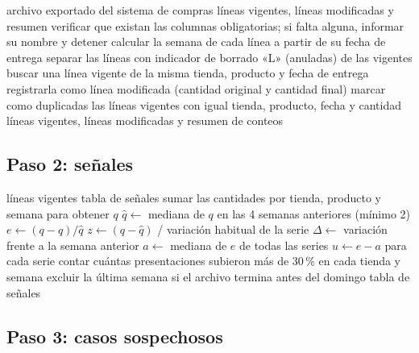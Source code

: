 \begin{algorithm}[H]
\caption{Limpieza del archivo}
\label{alg:limpiar}
\begin{algorithmic}[1]
\Require archivo exportado del sistema de compras
\Ensure líneas vigentes, líneas modificadas y resumen
\State verificar que existan las columnas obligatorias; si falta alguna, informar su nombre y detener
\State calcular la semana de cada línea a partir de su fecha de entrega
\State separar las líneas con indicador de borrado «L» (anuladas) de las vigentes
    \State buscar una línea vigente de la misma tienda, producto y fecha de entrega
        \State registrarla como línea modificada (cantidad original y cantidad final)
    \EndIf
\EndFor
\State marcar como duplicadas las líneas vigentes con igual tienda, producto, fecha y cantidad
\State \Return líneas vigentes, líneas modificadas y resumen de conteos
\end{algorithmic}
\end{algorithm}

\subsection{Paso 2: señales}

\begin{algorithm}[H]
\caption{Cálculo de señales por tienda, producto y semana}
\label{alg:senales}
\begin{algorithmic}[1]
\Require líneas vigentes
\Ensure tabla de señales
\State sumar las cantidades por tienda, producto y semana para obtener $q$
        \State $\hat q \gets$ mediana de $q$ en las 4 semanas anteriores (mínimo 2)
        \State $e \gets (q - \hat q) / \hat q$ 
        \State $z \gets (q - \hat q)$ / variación habitual de la serie
        \State $\Delta \gets$ variación frente a la semana anterior
    \EndFor
\EndFor
{}
    \State $a \gets$ mediana de $e$ de todas las series 
    \State $u \gets e - a$ para cada serie 
\EndFor
\State contar cuántas presentaciones subieron más de 30\,\% en cada tienda y semana
\State excluir la última semana si el archivo termina antes del domingo
\State \Return tabla de señales
\end{algorithmic}
\end{algorithm}

\subsection{Paso 3: casos sospechosos}

